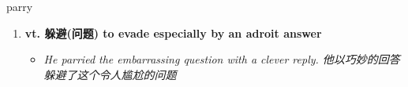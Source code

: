 
\begin{frame}
{\huge parry}
\begin{center}
\begin{enumerate}\Large
  \item \textbf{vt. 躲避(问题) to evade especially by an adroit answer}
  \begin{itemize}
    \item \em{\Large{He parried the embarrassing question with a clever reply. 他以巧妙的回答躲避了这个令人尴尬的问题}}
  \end{itemize}
\end{enumerate}
\end{center}
\end{frame}
